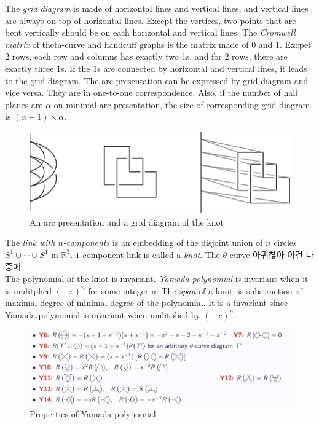 \documentclass{article}
\theoremstyle{definition}
\theoremstyle{theorem}
\theoremstyle{proposition}
\theoremstyle{corollary}
\begin{document}
The \textit{grid diagram} is made of horizontal lines and vertical lines, and vertical lines are always on top of horizontal lines. Except the vertices, two points that are bent vertically should be on each horizontal and vertical lines. The \textit{Cromwell matrix} of theta-curve and handcuff graphs is the matrix made of 0 and 1. Excpet 2 rows, each row and columns has exactly two 1s, and for 2 rows, there are exactly three 1s. If the 1s are connected by horizontal and vertical lines, it leads to the grid diagram. The arc presentation can be expressed by grid diagram and vice versa. They are in one-to-one correspondence. Also, if the number of half planes are $\alpha$ on minimal arc presentation, the size of corresponding grid diagram is $(\alpha - 1) \times \alpha$.\\

\begin{figure}[h]
    \centerline{\includegraphics[width=0.5\linewidth]{An arc presentation and a grid diagram of the knot.png}}
    \caption{An arc presentation and a grid diagram of the knot}
    \label{figure_2}
\end{figure}

The \textit{link with $n$-components} is an embedding of the disjoint union of $n$ circles $S^1 \cup \cdots \cup S^1$ in $\mathbb{R}^3$. $1$-component link is called a \textit{knot}. The $\theta$-curve 아귀찮아 이건 나중에\\

The polynomial of the knot is invariant. \textit{Yamada polynomial} is invariant when it is mulitplied $(-x)^n$ for some integer n. The \textit{span} of a knot, is substraction of maximal degree of minimal degree of the polynomial. It is a invariant since Yamada polynomial is invariant when mulitplied by $(-x)^n$.\\

\begin{figure}
    \centerline{\includegraphics[width=0.75\linewidth]{yamada_property.png}}
    \caption{Properties of Yamada polynomial.}
    \label{figure_3}
\end{figure}
\end{document}
